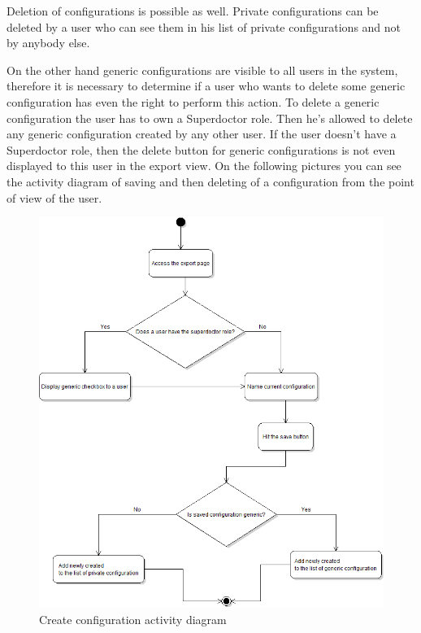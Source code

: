 \documentclass[thesis=B,english]{FITthesis}[2012/10/20]
\begin{document}
Deletion of configurations is possible as well. Private configurations can be deleted by a user who can see them in his list of private configurations and not by anybody else. 

On the other hand generic configurations are visible to all users in the system, therefore it is necessary to determine if a user who wants to delete some generic configuration has even the right to perform this action. To delete a generic configuration the user has to own a Superdoctor role. Then he's allowed to delete any generic configuration created by any other user. If the user doesn't have a Superdoctor role, then the delete button for generic configurations is not even displayed to this user in the export view.
On the following pictures you can see the activity diagram of saving and then deleting of a configuration from the point of view of the user.
\begin{figure}[ht]\centering
\includegraphics[width=0.5\paperwidth]{createConfigurationDiagram}
		\caption{Create configuration activity diagram}
\end{figure}
\end{document}
